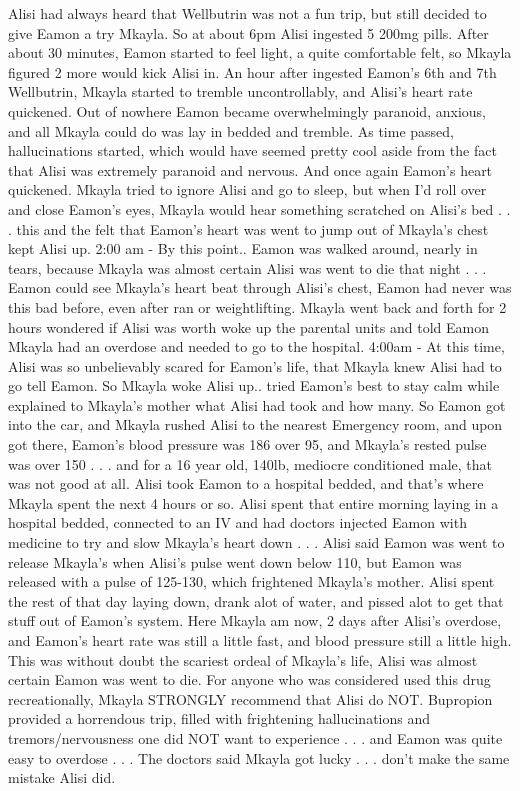 \documentclass[12pt]{book}
\begin{document}
Alisi had always heard that Wellbutrin was not a fun trip, but still decided to give Eamon a try Mkayla. So at about 6pm Alisi ingested 5 200mg pills. After about 30 minutes, Eamon started to feel light, a quite comfortable felt, so Mkayla figured 2 more would kick Alisi in. An hour after ingested Eamon's 6th and 7th Wellbutrin, Mkayla started to tremble uncontrollably, and Alisi's heart rate quickened. Out of nowhere Eamon became overwhelmingly paranoid, anxious, and all Mkayla could do was lay in bedded and tremble. As time passed, hallucinations started, which would have seemed pretty cool aside from the fact that Alisi was extremely paranoid and nervous. And once again Eamon's heart quickened. Mkayla tried to ignore Alisi and go to sleep, but when I'd roll over and close Eamon's eyes, Mkayla would hear something scratched on Alisi's bed . . .  this and the felt that Eamon's heart was went to jump out of Mkayla's chest kept Alisi up. 2:00 am - By this point.. Eamon was walked around, nearly in tears, because Mkayla was almost certain Alisi was went to die that night . . .  Eamon could see Mkayla's heart beat through Alisi's chest, Eamon had never was this bad before, even after ran or weightlifting. Mkayla went back and forth for 2 hours wondered if Alisi was worth woke up the parental units and told Eamon Mkayla had an overdose and needed to go to the hospital. 4:00am - At this time, Alisi was so unbelievably scared for Eamon's life, that Mkayla knew Alisi had to go tell Eamon. So Mkayla woke Alisi up.. tried Eamon's best to stay calm while explained to Mkayla's mother what Alisi had took and how many. So Eamon got into the car, and Mkayla rushed Alisi to the nearest Emergency room, and upon got there, Eamon's blood pressure was 186 over 95, and Mkayla's rested pulse was over 150 . . .  and for a 16 year old, 140lb, mediocre conditioned male, that was not good at all. Alisi took Eamon to a hospital bedded, and that's where Mkayla spent the next 4 hours or so. Alisi spent that entire morning laying in a hospital bedded, connected to an IV and had doctors injected Eamon with medicine to try and slow Mkayla's heart down . . .  Alisi said Eamon was went to release Mkayla's when Alisi's pulse went down below 110, but Eamon was released with a pulse of 125-130, which frightened Mkayla's mother. Alisi spent the rest of that day laying down, drank alot of water, and pissed alot to get that stuff out of Eamon's system. Here Mkayla am now, 2 days after Alisi's overdose, and Eamon's heart rate was still a little fast, and blood pressure still a little high. This was without doubt the scariest ordeal of Mkayla's life, Alisi was almost certain Eamon was went to die. For anyone who was considered used this drug recreationally, Mkayla STRONGLY recommend that Alisi do NOT. Bupropion provided a horrendous trip, filled with frightening hallucinations and tremors/nervousness one did NOT want to experience . . .  and Eamon was quite easy to overdose . . .  The doctors said Mkayla got lucky . . .  don't make the same mistake Alisi did.
\end{document}
